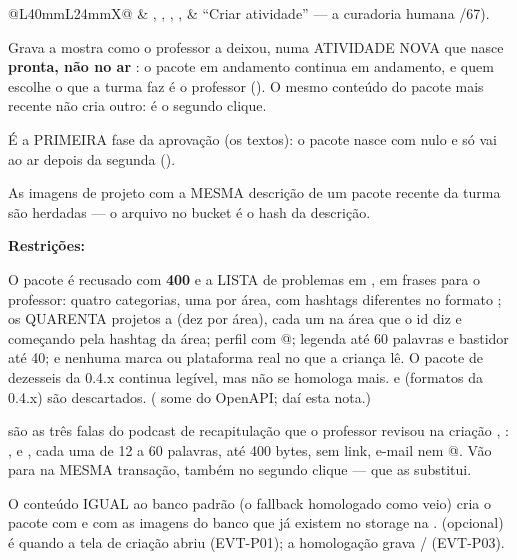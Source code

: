 \begin{tabularx}{\linewidth}{@{}L{40mm}L{24mm}X@{}}
 & , , , ,  & \enquote{Criar atividade} --- a curadoria humana /67).\par Grava a mostra como o professor a deixou, numa ATIVIDADE NOVA que nasce \textbf{pronta, não no ar} : o pacote em andamento continua em andamento, e quem escolhe o que a turma faz é o professor (). O mesmo conteúdo do pacote mais recente não cria outro: é o segundo clique.\par É a PRIMEIRA fase da aprovação (os textos): o pacote nasce com  nulo e só vai ao ar depois da segunda ().\par As imagens de projeto com a MESMA descrição de um pacote recente da turma são herdadas --- o arquivo no bucket é o hash da descrição.\par \textbf{Restrições:}\par \hspace*{1em}\textbullet{} O pacote é recusado com \textbf{400}  e a LISTA de problemas em , em frases para o professor: quatro categorias, uma por área, com hashtags diferentes no formato ; os QUARENTA projetos  a  (dez por área), cada um na área que o id diz e começando pela hashtag da área; perfil com @; legenda até 60 palavras e bastidor até 40; e nenhuma marca ou plataforma real no que a criança lê. O pacote de dezesseis da 0.4.x continua legível, mas não se homologa mais.  e  (formatos da 0.4.x) são descartados. ( some do OpenAPI; daí esta nota.)\par \hspace*{1em}\textbullet{}  são as três falas do podcast de recapitulação que o professor revisou na criação , : ,  e , cada uma de 12 a 60 palavras, até 400 bytes, sem link, e-mail nem @. Vão para  na MESMA transação, também no segundo clique --- que as substitui.\par \hspace*{1em}\textbullet{} O conteúdo IGUAL ao banco padrão (o fallback homologado como veio) cria o pacote com  e com as imagens do banco que já existem no storage na .  (opcional) é quando a tela de criação abriu (EVT-P01); a homologação grava / (EVT-P03).\\

\end{tabularx}
